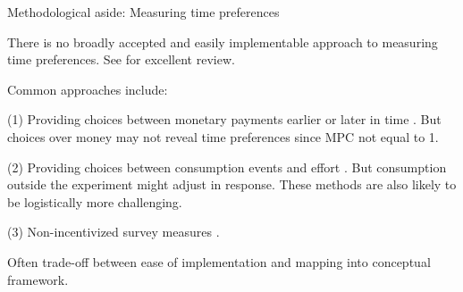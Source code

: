 \documentclass[aspectratio=169, 10pt, handout]{beamer}
\newenvironment{wideitemize}{\itemize\addtolength{\itemsep}{10pt}}{\enditemize}
\begin{document}
\begin{frame}{Methodological aside: Measuring time preferences}

\begin{wideitemize}

	\item There is no broadly accepted and easily implementable approach to measuring time preferences. See \cite{cohen2016measuring} for excellent review.

	\item Common approaches include:
	
	\begin{wideitemize}
	
		\item[(1)] Providing choices between monetary payments earlier or later in time \citep{andersen2008eliciting,andreoni2012estimating}. But choices over money may not reveal time preferences since MPC not equal to 1.
		
		\item[(2)] Providing choices between consumption events and effort \citep{mcclure2007time,augenblick2015working}. But consumption outside the experiment might adjust in response. These methods are also likely to be logistically more challenging. 
		
        \item[(3)] Non-incentivized survey measures \citep{falk2018global}.

	\end{wideitemize}

    \item Often trade-off between ease of implementation and mapping into conceptual framework. 


\end{wideitemize}


\end{frame}
\end{document}
